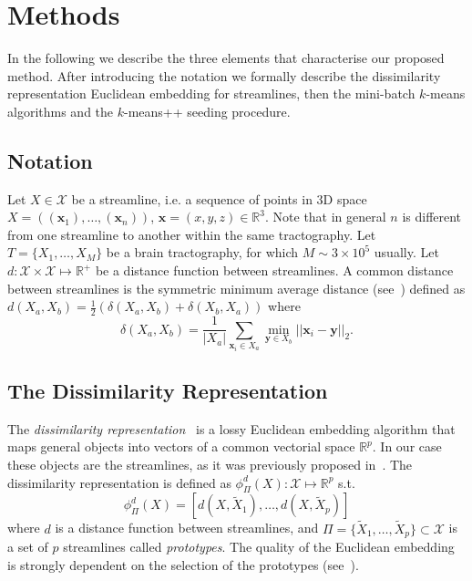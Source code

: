 \section{Methods}
\label{sec:methods}
In the following we describe the three elements that characterise our
proposed method. After introducing the notation we formally describe
the dissimilarity representation Euclidean embedding for streamlines,
then the mini-batch $k$-means algorithms and the $k$-means++ seeding
procedure.


\subsection{Notation}
\label{sec:notation}
Let $X \in \mathcal{X}$ be a streamline, i.e. a sequence of points in
$3$D space $X = \left((\mathbf{x}_1),\ldots,(\mathbf{x}_n)\right)$,
$\mathbf{x} = (x,y,z) \in \mathbb{R}^3$. Note that in general $n$ is
different from one streamline to another within the same
tractography. Let $T = \{X_1,\ldots,X_M\}$ be a brain tractography,
for which $M \sim 3 \times 10^5$ usually. Let $d:\mathcal{X} \times
\mathcal{X} \mapsto \mathbb{R}^+$ be a distance function between
streamlines. A common distance between streamlines is the symmetric
minimum average distance (see~\cite{zhang2008identifying}) defined as
$d(X_a,X_b) = \frac{1}{2}(\delta(X_a,X_b) + \delta(X_b,X_a))$ where
\begin{equation}
  \label{eq:mam_distance}
  \delta(X_a,X_b) = \frac{1}{|X_a|} \sum_{\mathbf{x}_i \in X_a}
    \min_{\mathbf{y} \in X_b} ||\mathbf{x}_i - \mathbf{y}||_2.
\end{equation}



\subsection{The Dissimilarity Representation}
The \emph{dissimilarity representation}~\cite{pekalska2002generalized}
is a lossy Euclidean embedding algorithm that maps general objects
into vectors of a common vectorial space $\mathbb{R}^p$. In our case
these objects are the streamlines, as it was previously proposed
in~\cite{olivetti2012approximation}. The dissimilarity representation
is defined as $\phi_{\Pi}^d(X):\mathcal{X} \mapsto \mathbb{R}^p$ s.t.
\begin{equation}
  \phi_{\Pi}^d(X) = [d(X,\tilde{X}_1) ,\ldots, d(X,\tilde{X}_p)]
\label{eq:dissimilarity_representation}
\end{equation}
where $d$ is a distance function between streamlines, and $\Pi =
\{\tilde{X}_1, \ldots, \tilde{X}_p\} \subset \mathcal{X}$ is a set of
$p$ streamlines called \emph{prototypes}. The quality of the Euclidean
embedding is strongly dependent on the selection of the prototypes
(see~\cite{pekalska2006prototype,olivetti2012approximation}).

